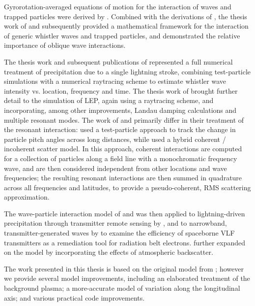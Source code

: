 Gyrorotation-averaged equations of motion for the interaction of waves and trapped particles were derived by \cite{Bell1984}. Combined with the derivations of \cite{Ristic1992}, the thesis work of \cite{Ristic1993} and subsequently \cite{Ristic1998} provided a mathematical framework for the interaction of generic whistler waves and trapped particles, and demonstrated the relative importance of oblique wave interactions. 

The thesis work and subsequent publications of \citeauthor{Lauben1998} \citep{Lauben1998, Lauben1999, Lauben2001} represented a full numerical treatment of precipitation due to a single lightning stroke, combining test-particle simulations with a numerical raytracing scheme to estimate whistler wave intensity vs. location, frequency and time. The thesis work of \cite{Bortnik2005} brought further detail to the simulation of LEP, again using a raytracing scheme, and incorporating, among other improvements, Landau damping calculations and multiple resonant modes. The work of \citeauthor{Lauben1998} and \citeauthor{Bortnik2005} primarily differ in their treatment of the resonant interaction: \citeauthor{Lauben1998} used a test-particle approach to track the change in particle pitch angles across long distances, while \citeauthor{Bortnik2005} used a hybrid coherent / incoherent scatter model. In this approach, coherent interactions are computed for a collection of particles along a field line with a monochromatic frequency wave, and are then considered independent from other locations and wave frequencies; the resulting resonant interactions are then summed in quadrature across all frequencies and latitudes, to provide a pseudo-coherent, RMS scattering approximation.

The wave-particle interaction model of \cite{Bortnik2005} and \cite{Bortnik2006} was then applied to lightning-driven precipitation through transmitter remote sensing by \cite{Peter2007}, and to narrowband, transmitter-generated waves by \cite{Kulkarni2009} to examine the efficiency of spaceborne VLF transmitters as a remediation tool for radiation belt electrons. \cite{Cotts2011} further expanded on the \citeauthor{Bortnik2005} model by incorporating the effects of atmospheric backscatter.

The work presented in this thesis is based on the original model from \cite{Bortnik2005}; however we provide several model improvements, including an elaborated treatment of the background plasma; a more-accurate model of variation along the longitudinal axis; and various practical code improvements.

